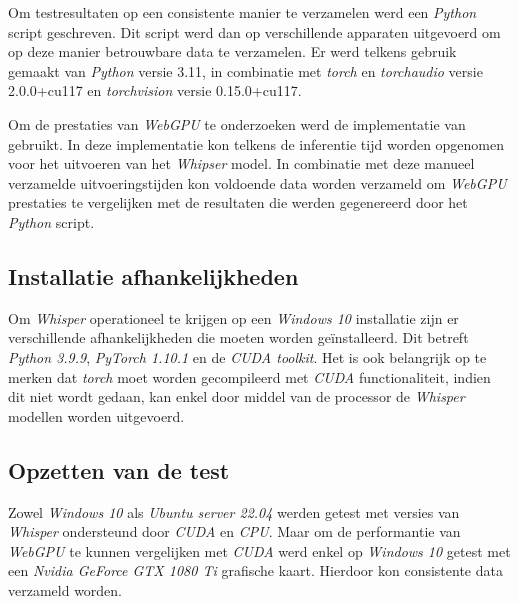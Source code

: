\bigbreak{}

Om testresultaten op een consistente manier te verzamelen werd een \textit{Python} script geschreven. Dit script werd dan op verschillende apparaten uitgevoerd om op deze manier betrouwbare data te verzamelen. Er werd telkens gebruik gemaakt van \textit{Python} versie 3.11, in combinatie met \textit{torch} en \textit{torchaudio} versie 2.0.0+cu117 en \textit{torchvision} versie 0.15.0+cu117.

\bigbreak{}

Om de prestaties van \textit{WebGPU} te onderzoeken werd de implementatie van \textcite{Fleetwood2024} gebruikt. In deze implementatie kon telkens de inferentie tijd worden opgenomen voor het uitvoeren van het \textit{Whipser} model. In combinatie met deze manueel verzamelde uitvoeringstijden kon voldoende data worden verzameld om \textit{WebGPU} prestaties te vergelijken met de resultaten die werden gegenereerd door het \textit{Python} script.

\bigbreak{}

\subsection{Installatie afhankelijkheden}

Om \textit{Whisper} operationeel te krijgen op een \textit{Windows 10} installatie zijn er verschillende afhankelijkheden die moeten worden geïnstalleerd. Dit betreft \textit{Python 3.9.9}, \textit{PyTorch 1.10.1} en de \textit{CUDA toolkit}. Het is ook belangrijk op te merken dat \textit{torch} moet worden gecompileerd met \textit{CUDA} functionaliteit, indien dit niet wordt gedaan, kan enkel door middel van de processor de \textit{Whisper} modellen worden uitgevoerd.

\subsection{Opzetten van de test}

Zowel \textit{Windows 10} als \textit{Ubuntu server 22.04} werden getest met versies van \textit{Whisper} ondersteund door \textit{CUDA} en \textit{CPU}. Maar om de performantie van \textit{WebGPU} te kunnen vergelijken met \textit{CUDA} werd enkel op \textit{Windows 10} getest met een \textit{Nvidia GeForce GTX 1080 Ti} grafische kaart. Hierdoor kon consistente data verzameld worden.

\break{}


